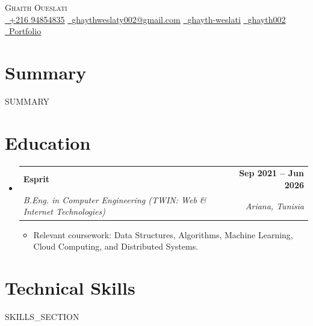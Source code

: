 \documentclass[letterpaper,11pt]{article}
\makeatletter
\newcommand{\resumeItem}[1]{\item\small{#1 \vspace{-2pt}}}
\newcommand{\resumeSubheading}[4]{
  \vspace{-2pt}\item
    \begin{tabular*}{1.0\textwidth}{l@{\extracolsep{\fill}}r}
      \textbf{\large #1} & \textbf{\small #2} \\
      \textit{\large #3} & \textit{\small #4} \\
    \end{tabular*}\vspace{-7pt}
}
\newcommand{\resumeItemListStart}{\begin{itemize}}
\newcommand{\resumeItemListEnd}{\end{itemize}\vspace{-5pt}}
\newcommand{\resumeSubHeadingListStart}{\begin{itemize}[leftmargin=0in, label={}]}
\newcommand{\resumeSubHeadingListEnd}{\end{itemize}}
\makeatother
\begin{document}
\begin{center}
    {\Huge \scshape Ghaith Oueslati} \\ \vspace{1pt}
    \small
    \href{tel:+21694854835}{\faPhone\ \underline{+216 94854835}} \quad
    \href{mailto:ghaythweslaty002@gmail.com}{\faEnvelope\ \underline{ghaythweslaty002@gmail.com}} \quad
    \href{https://www.linkedin.com/in/ghayth-weslati-520394266/}{\faLinkedin\ \underline{ghayth-weslati}} \quad
    \href{https://github.com/ghayth002}{\faGithub\ \underline{ghayth002}} \quad
    \href{https://oueslati-ghaith.onrender.com/}{\faGlobe\ \underline{Portfolio}}
\end{center}

\section{Summary}
\small{{{SUMMARY}}}

\section{Education}
\resumeSubHeadingListStart
    \resumeSubheading
      {Esprit}{Sep 2021 -- Jun 2026}
      {B.Eng. in Computer Engineering (TWIN: Web \& Internet Technologies)}{Ariana, Tunisia}
      \resumeItemListStart
        \resumeItem{Relevant coursework: Data Structures, Algorithms, Machine Learning, Cloud Computing, and Distributed Systems.}
      \resumeItemListEnd
\resumeSubHeadingListEnd

\section{Technical Skills}
\begin{itemize}[leftmargin=0.15in, label={}]\small{\item{
     {{SKILLS_SECTION}}
}}
\end{itemize}

\end{document}
